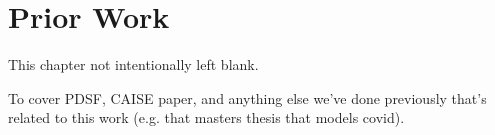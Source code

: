 \chapter{Prior Work}\label{chap:prior_work}

This chapter not intentionally left blank.

To cover PDSF, CAISE paper, and anything else we've done previously that's
related to this work (e.g. that masters thesis that models covid).